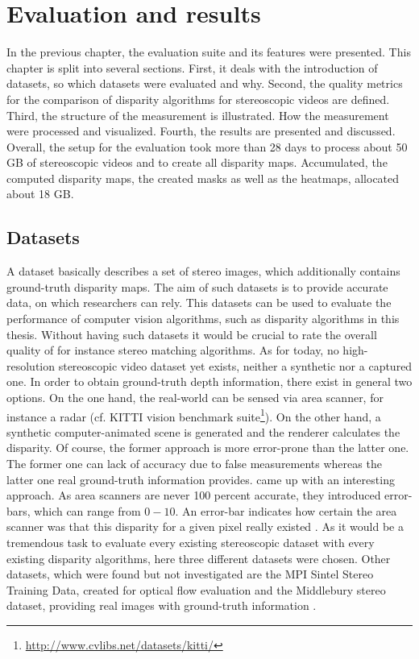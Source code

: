 \chapter{Evaluation and results}
\label{chap:eval}

In the previous chapter, the evaluation suite and its features were presented.
This chapter is split into several sections.
First, it deals with the introduction of datasets, so which datasets were evaluated and why.
Second, the quality metrics for the comparison of disparity algorithms for stereoscopic videos are defined.
Third, the structure of the measurement is illustrated.
How the measurement were processed and visualized.
Fourth, the results are presented and discussed.
\newline\newline\noindent Overall, the setup for the evaluation took more than 28 days to process about 50 GB of stereoscopic videos and to create all disparity maps.
Accumulated, the computed disparity maps, the created masks as well as the heatmaps, allocated about 18 GB.

\section{Datasets}

A dataset basically describes a set of stereo images, which additionally contains ground-truth disparity maps.
The aim of such datasets is to provide accurate data, on which researchers can rely.
This datasets can be used to evaluate the performance of computer vision algorithms, such as disparity algorithms in this thesis.
Without having such datasets it would be crucial to rate the overall quality of for instance stereo matching algorithms.
As for today, no high-resolution stereoscopic video dataset yet exists, neither a synthetic nor a captured one.
In order to obtain ground-truth depth information, there exist in general two options.
On the one hand, the real-world can be sensed via area scanner, for instance a radar (cf. KITTI vision benchmark suite\footnote{\url{http://www.cvlibs.net/datasets/kitti/}}).
On the other hand, a synthetic computer-animated scene is generated and the renderer calculates the disparity.
Of course, the former approach is more error-prone than the latter one.
The former one can lack of accuracy due to false measurements whereas the latter one real ground-truth information provides.
\newline\newline\noindent \citeauthor{kondermann2015stereo} came up with an interesting approach.
As area scanners are never 100 percent accurate, they introduced error-bars, which can range from $0-10$.
An error-bar indicates how certain the area scanner was that this disparity for a given pixel really existed \citep{kondermann2015stereo}.
As it would be a tremendous task to evaluate every existing stereoscopic dataset with every existing disparity algorithms, here three different datasets were chosen.
Other datasets, which were found but not investigated are the MPI Sintel Stereo Training Data, created for optical flow evaluation \citep{Butler:ECCV:2012} and the Middlebury stereo dataset, providing real images with ground-truth information \citep{scharstein2006middlebury}.


